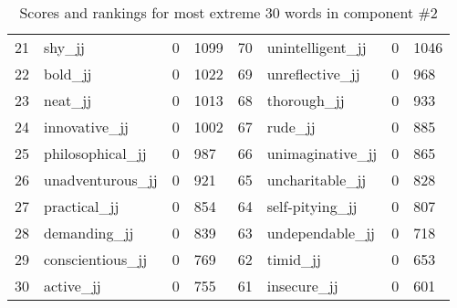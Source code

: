 \begin{table}[tbp]
\begin{tabular}{| rlr@{.}l | rlr@{.}l |}
    21 & shy\_jj & 0 & 1099    &    70 & unintelligent\_jj & 0 & 1046 \\
    22 & bold\_jj & 0 & 1022    &    69 & unreflective\_jj & 0 & 968 \\
    23 & neat\_jj & 0 & 1013    &    68 & thorough\_jj & 0 & 933 \\
    24 & innovative\_jj & 0 & 1002    &    67 & rude\_jj & 0 & 885 \\
    25 & philosophical\_jj & 0 & 987    &    66 & unimaginative\_jj & 0 & 865 \\
    26 & unadventurous\_jj & 0 & 921    &    65 & uncharitable\_jj & 0 & 828 \\
    27 & practical\_jj & 0 & 854    &    64 & self-pitying\_jj & 0 & 807 \\
    28 & demanding\_jj & 0 & 839    &    63 & undependable\_jj & 0 & 718 \\
    29 & conscientious\_jj & 0 & 769    &    62 & timid\_jj & 0 & 653 \\
    30 & active\_jj & 0 & 755    &    61 & insecure\_jj & 0 & 601 \\
    \hline
    \end{tabular}
    \caption{Scores and rankings for most extreme 30 words in component \#2} 
\end{table}
\clearpage
